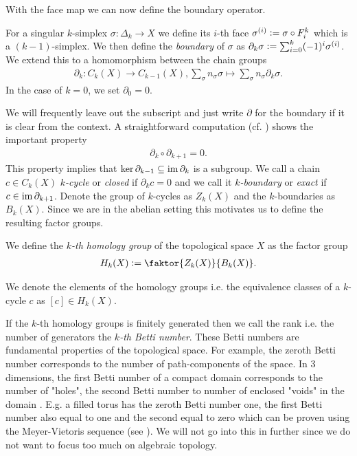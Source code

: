 \documentclass[../main.tex]{subfiles}
\begin{document}
With the face map we can now define the boundary operator.
\begin{definition}[Boundary]
    For a singular $k$-simplex $\sigma: \Delta_k \rightarrow X$ we define its $i$-th face 
    $\sigma^{(i)} \vcentcolon= \sigma \circ F_i^k$ which is a $(k-1)$-simplex. 
    We then define the \textit{boundary} of $\sigma$ as 
    $\partial_k \sigma \vcentcolon= \sum_{i=0}^k (-1)^i \sigma^{(i)}$. We extend this 
    to a homomorphism between the chain groups
    \begin{align*}
        \partial_k: C_k(X) \rightarrow C_{k-1}(X), 
        \sum_\sigma n_\sigma \sigma \mapsto \sum_\sigma n_\sigma \partial_k \sigma.
    \end{align*}
    In the case of $k=0$, we set $\partial_0 = 0$.
\end{definition}
We will frequently leave out the subscript and just write $\partial$ for the boundary 
if it is clear from the context.
A straightforward computation (cf. \cite[Lemma 1.6]{topology_and_geometry}) shows the 
important property 
\begin{align*}
    \partial_k \circ \partial_{k+1} = 0.
\end{align*}
This property implies that $\ker \partial_{k-1} \subseteq \operatorname{im} \partial_k$ is 
a subgroup. We call a chain $c \in C_k(X)$ \textit{$k$-cycle} or \textit{closed} if $\partial_k c = 0$ and 
we call it \textit{$k$-boundary} or \textit{exact} if $c \in \operatorname{im} \partial_{k+1}$. 
Denote the group of $k$-cycles as $Z_k(X)$ and the $k$-boundaries as $B_k(X)$.
Since we are in the abelian setting this motivates us to define 
the resulting factor groups.
\begin{definition}
    We define the \textit{$k$-th homology group} of the topological space $X$ as the factor group
    \begin{align*}
        H_k(X) \vcentcolon= \faktor{Z_k(X)}{B_k(X)}.
    \end{align*} 
\end{definition}
We denote the elements of the homology groups i.e. the equivalence classes of a 
$k$-cycle $c$ as $[c] \in H_k(X)$.

If the $k$-th homology groups is finitely generated then we 
call the rank i.e. the number of generators the \textit{$k$-th Betti number}. 
These Betti numbers are fundamental properties of the topological space. 
For example, the zeroth Betti number corresponds to the number of 
path-components of the space. In 3 dimensions, the first Betti number of 
a compact domain
corresponds to the number of "holes", the second Betti number to 
number of enclosed "voids" in the domain \cite[p.14]{arnold}. E.g. a filled torus 
has the zeroth Betti number one, the first Betti number also equal to one
and the second equal to zero which can be proven using the Meyer-Vietoris sequence
(see \cite[Sec.\,IV.18]{topology_and_geometry}). We will not go into this in further
since we do not want to focus too much on algebraic topology.
\end{document}
